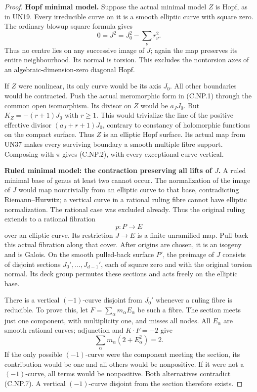 \begin{proof}
\par\medskip\noindent\textbf{Hopf minimal model.}
Suppose the actual minimal
model \(Z\) is Hopf, as in
UN19. Every irreducible
curve on it is a smooth
elliptic curve with square
zero. The ordinary blowup
square formula gives
\[
                 0=J^2=J_0^2-\sum_\nu r_\nu^2.
 \tag{C.NP.5}
\]
Thus no centre lies on
any successive image of
\(J\); again the map
preserves its entire
neighbourhood. Its normal
is torsion. This excludes
the nontorsion axes of an
algebraic-dimension-zero
diagonal Hopf.

If \(Z\) were nonlinear,
its only curve would be
its axis \(J_0\). All
other boundaries would
be contracted. Push the
actual meromorphic form
in (C.NP.1) through the
common open isomorphism.
Its divisor on \(Z\)
would be \(a_JJ_0\).
But \(K_Z=-(r+1)J_0\)
with \(r\ge1\). This
would trivialize the
line of the positive
effective divisor
\((a_J+r+1)J_0\), contrary
to constancy of holomorphic
functions on the compact
surface. Thus \(Z\) is
an elliptic Hopf surface.
Its actual map from UN37
makes every surviving
boundary a smooth multiple
fibre support. Composing
with \(\pi\) gives (C.NP.2),
with every exceptional
curve vertical.

\par\medskip\noindent\textbf{Ruled minimal model: the contraction preserving all lifts of \(J\).}
A ruled minimal base of
genus at least two cannot
occur. The normalization
of the image of \(J\)
would map nontrivially
from an elliptic curve
to that base, contradicting
Riemann--Hurwitz; a
vertical curve in a
rational ruling fibre
cannot have elliptic
normalization. The
rational case was
excluded already.
Thus the original ruling
extends to a rational
fibration
\[
                             p:P\longrightarrow E
 \tag{C.NP.6}
\]
over an elliptic curve.
Its restriction \(J\to E\)
is a finite unramified
map. Pull back this
actual fibration along
that cover. After origins
are chosen, it is an
isogeny and is Galois.
On the smooth pulled-back
surface \(P'\), the
preimage of \(J\) consists
of disjoint sections
\(J_0',\ldots,J_{d-1}'\),
each of square zero and
with the original torsion
normal. Its deck group
permutes these sections
and acts freely on the
elliptic base.

There is a vertical
\((-1)\)-curve disjoint
from \(J_0'\) whenever
a ruling fibre is reducible.
To prove this, let
\(F=\sum_\alpha m_\alpha E_\alpha\)
be such a fibre. The
section meets just one
component, with multiplicity
one, and misses all nodes.
All \(E_\alpha\) are
smooth rational curves;
adjunction and \(K\cdot F=-2\)
give
\[
             \sum_\alpha
                    m_\alpha(2+E_\alpha^2)=2 .
 \tag{C.NP.7}
\]
If the only possible
\((-1)\)-curve were the
component meeting the
section, its contribution
would be one and all
others would be nonpositive.
If it were not a
\((-1)\)-curve, all terms
would be nonpositive.
Both alternatives contradict
(C.NP.7). A vertical
\((-1)\)-curve disjoint
from the section therefore
exists.


\end{proof}
